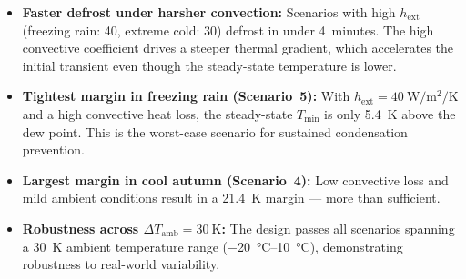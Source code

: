 \begin{itemize}
    \item \textbf{Faster defrost under harsher convection:} Scenarios with high $h_\text{ext}$ (freezing rain: 40, extreme cold: 30) defrost in under 4~minutes. The high convective coefficient drives a steeper thermal gradient, which accelerates the initial transient even though the steady-state temperature is lower.
    \item \textbf{Tightest margin in freezing rain (Scenario~5):} With $h_\text{ext} = \SI{40}{\watt\per\metre\squared\per\kelvin}$ and a high convective heat loss, the steady-state $T_\text{min}$ is only \SI{5.4}{\kelvin} above the dew point. This is the worst-case scenario for sustained condensation prevention.
    \item \textbf{Largest margin in cool autumn (Scenario~4):} Low convective loss and mild ambient conditions result in a \SI{21.4}{\kelvin} margin --- more than sufficient.
    \item \textbf{Robustness across $\Delta T_\text{amb} = \SI{30}{\kelvin}$:} The design passes all scenarios spanning a \SI{30}{\kelvin} ambient temperature range (\SIrange{-20}{10}{\celsius}), demonstrating robustness to real-world variability.
\end{itemize}
